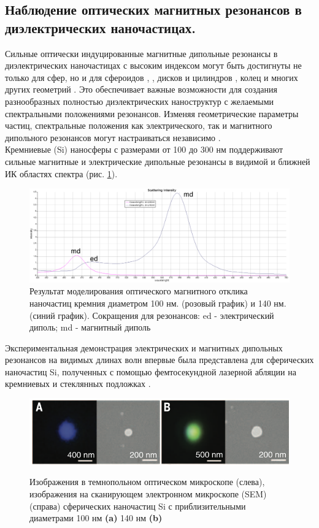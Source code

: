\subsection*{Наблюдение оптических магнитных резонансов в диэлектрических наночастицах.}
\hspace*{2mm}
Сильные оптически индуцированные магнитные дипольные резонансы в диэлектрических наночастицах с высоким индексом могут быть достигнуты не только для сфер, но и для сфероидов \cite{articleDirVi}, \cite{optScatShper}, дисков и цилиндров \cite{multLightScat}, колец \cite{contrMagnModes} и многих других геометрий \cite{nearInfrMR}. Это обеспечивает важные возможности для создания разнообразных полностью диэлектрических наноструктур с желаемыми спектральными положениями резонансов. Изменяя геометрические параметры частиц, спектральные положения как электрического, так и магнитного дипольного резонансов могут настраиваться независимо \cite{optScatDeilectrHightIndex}.
\\
\hspace*{2mm}
Кремниевые (Si) наносферы с размерами от 100 до 300 нм поддерживают сильные магнитные и электрические дипольные резонансы в видимой и ближней ИК областях спектра (рис. \ref{fig2}). 
 \begin{figure}[h]
	\centering
	\includegraphics[width=1\linewidth]{images/graph1.png}
	\caption{Результат моделирования оптического магнитного отклика наночастиц кремния  диаметром 100 нм. (розовый график) и 140 нм. (синий график).  Сокращения для резонансов: ed - электрический диполь; md - магнитный диполь}
	\label{fig2}
\end{figure}
Экспериментальная демонстрация электрических и магнитных дипольных резонансов на видимых длинах волн впервые была представлена для сферических наночастиц Si, полученных с помощью фемтосекундной лазерной абляции на кремниевых и стеклянных подложках \cite{kuznetsov2012luk}. 
 \begin{figure}[h]
	\centering
	\includegraphics[width=0.7\linewidth]{images/fig2.png}
	\caption{ Изображения в темнопольном оптическом микроскопе (слева), изображения на сканирующем электронном микроскопе (SEM) (справа)  сферических наночастиц Si с приблизительными диаметрами 100 нм \textbf{(a)} 140 нм \textbf{(b)}} \cite{kuznetsov2012luk}
    \label{fig3}
\end{figure}
